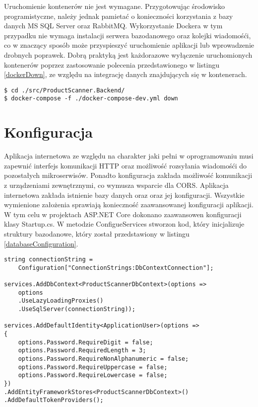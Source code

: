Uruchomienie kontenerów nie jest wymagane. Przygotowując środowisko programistyczne, należy jednak pamietać o konieczności korzystania z bazy danych MS SQL Server oraz RabbitMQ. Wykorzystanie Dockera w tym przypadku nie wymaga instalacji serwera bazodanowego oraz kolejki wiadomośći, co w znaczący sposób może przyspieszyć uruchomienie aplikacji lub wprowadzenie drobnych poprawek. Dobrą praktyką jest każdorazowe wyłączenie uruchomionych kontenerów poprzez zastosowanie polecenia przedstawionego w listingu \ref{dockerDown}, ze względu na integrację danych znajdujących się w kontenerach. 


\begin{lstlisting}[caption={Komenda docker-compose down.},label={dockerDown} ]
$ cd ./src/ProductScanner.Backend/
$ docker-compose -f ./docker-compose-dev.yml down
\end{lstlisting}


\section{Konfiguracja}

Aplikacja internetowa ze względu na charakter jaki pełni w oprogramowaniu musi zapewnić interfejs komunikacji HTTP oraz możliwość rozsyłania wiadomośći do pozostałych mikroserwisów. Ponadto konfiguracja zakłada możliwość komunikacji z urządzeniami zewnętrznymi, co wymusza wsparcie dla CORS. Aplikacja internetowa zakłada istnienie bazy danych oraz oraz jej konfiguracji. Wszystkie wymienione założenia sprawiają konieczność zaawansowanej konfiguracji aplikacji. W tym celu w projektach ASP.NET Core dokonano zaawansowen konfiguracji klasy Startup.cs. W metodzie ConfigueServices stworzon kod, który inicjalizuje struktury bazodanowe, który został przedstawiony w listingu \ref{databaseConfiguration}. 

\begin{lstlisting}[caption={Konfiguracja bazy danych oraz obiektu komunikacji bazodanowej.},label={databaseConfiguration} ]
string connectionString = 
	Configuration["ConnectionStrings:DbContextConnection"];
	
services.AddDbContext<ProductScannerDbContext>(options =>
	options
	.UseLazyLoadingProxies()
	.UseSqlServer(connectionString));

services.AddDefaultIdentity<ApplicationUser>(options =>
{
	options.Password.RequireDigit = false;
	options.Password.RequiredLength = 3;
	options.Password.RequireNonAlphanumeric = false;
	options.Password.RequireUppercase = false;
	options.Password.RequireLowercase = false;
})
.AddEntityFrameworkStores<ProductScannerDbContext>()
.AddDefaultTokenProviders();
\end{lstlisting}


